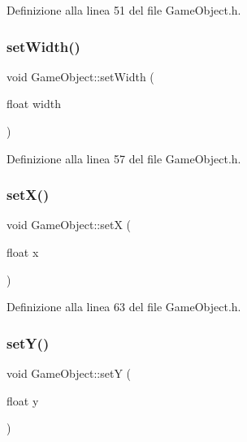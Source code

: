 Definizione alla linea 51 del file Game\+Object.\+h.

\mbox{\label{class_game_object_a1cbfb2faa92685d4d5ed5657f3a9c098}} 
\subsubsection{\texorpdfstring{set\+Width()}{setWidth()}}
{\footnotesize\ttfamily void Game\+Object\+::set\+Width (\begin{DoxyParamCaption}\item[{float}]{width }\end{DoxyParamCaption})\hspace{0.3cm}{\ttfamily [inline]}}



Definizione alla linea 57 del file Game\+Object.\+h.

\mbox{\label{class_game_object_aeab4f4a744cb428a7e6ed191bf65b9a9}} 
\subsubsection{\texorpdfstring{set\+X()}{setX()}}
{\footnotesize\ttfamily void Game\+Object\+::setX (\begin{DoxyParamCaption}\item[{float}]{x }\end{DoxyParamCaption})\hspace{0.3cm}{\ttfamily [inline]}}



Definizione alla linea 63 del file Game\+Object.\+h.

\mbox{\label{class_game_object_a4b12632d8662822440aa2f8a4b1b2002}} 
\subsubsection{\texorpdfstring{set\+Y()}{setY()}}
{\footnotesize\ttfamily void Game\+Object\+::setY (\begin{DoxyParamCaption}\item[{float}]{y }\end{DoxyParamCaption})\hspace{0.3cm}{\ttfamily [inline]}}



